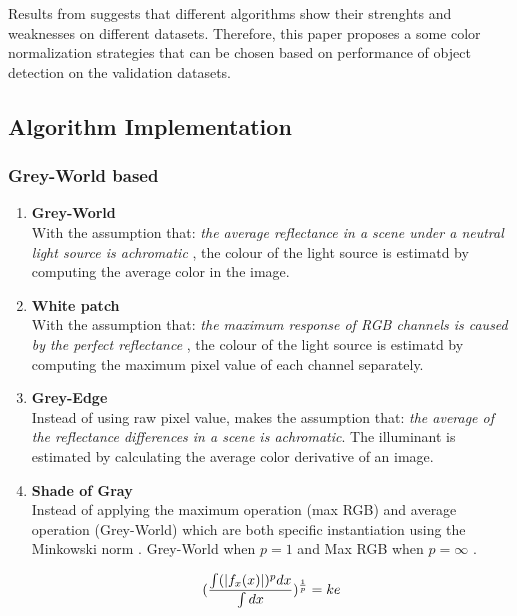 \documentclass[hyp]{socreport}
\DeclarePairedDelimiter{\abs}{\lvert}{\rvert}
\begin{document}
Results from  suggests that different
algorithms show their strenghts and weaknesses on different datasets. Therefore,
this paper proposes a some color normalization strategies that can be chosen
based on performance of object detection on the validation datasets.

\subsection{Algorithm Implementation}


\subsubsection{Grey-World based}

\begin{enumerate}

\item \textbf{Grey-World} \\ 
With the assumption that: \textit{the average reflectance
in a scene under a neutral light source is achromatic} , the colour of the light
source is estimatd by computing the average color in the image.

\item \textbf{White patch} \\
With the assumption that: \textit{the maximum response of RGB channels is caused
by the perfect reflectance} , the colour of the light
source is estimatd by computing the maximum pixel value of each channel separately.

\item \textbf{Grey-Edge} \\
Instead of using raw pixel value,  makes the assumption
that: \textit{the average of the reflectance differences in a scene is
  achromatic}. The illuminant is estimated by calculating the average color
derivative of an image.

\item \textbf{Shade of Gray} \\
Instead of applying the maximum operation (max RGB) and average operation
(Grey-World) which are both specific instantiation using the Minkowski norm
. Grey-World when $p=1$ and Max RGB when $p=\infty$ .

\[
  (\frac{\int (\abs{f_x(x)})^p dx}{\int dx})^{\frac{1}{p}} = ke
\]

\end{enumerate}
\end{document}
